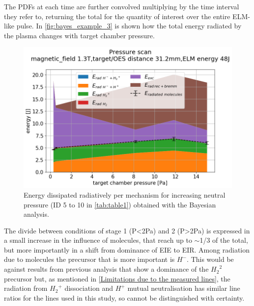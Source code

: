 The PDFs at each time are further convolved multiplying by the time interval they refer to, returning the total for the quantity of interest over the entire ELM-like pulse. In \autoref{fig:bayes_example_3} is shown how the total energy radiated by the plasma changes with target chamber pressure.
\begin{figure}[!ht]
	\centering
	\includegraphics[width=0.7\linewidth,trim={0 0 30 60},clip]{Chapters/chapter3/figs/Bayesian_strong_4.png}
	\caption{Energy dissipated radiatively per mechanism for increasing neutral pressure (ID 5 to 10 in \autoref{tab:table1}) obtained with the Bayesian analysis.}
	\label{fig:bayes_example_3}
\end{figure}
The divide between conditions of stage 1 (P<2Pa) and 2 (P>2Pa) is expressed in a small increase in the influence of molecules, that reach up to $\sim$1/3 of the total, but more importantly in a shift from dominance of EIE to EIR. Among radiation due to molecules the precursor that is more important is $H^-$. This would be against results from previous analysis that show a dominance of the ${H_2}^2$ precursor\cite{Akkermans2020} but, as mentioned in \autoref{Limitations due to the measured lines}, the radiation from ${H_2}^+$ dissociation and $H^+$ mutual neutralisation has similar line ratios for the lines used in this study, so cannot be distinguished with certainty.

